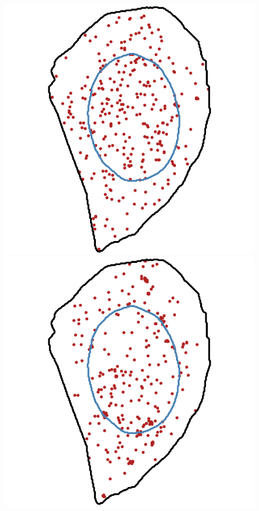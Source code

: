 \begin{figure}[h]
	\centering
		\includegraphics[width=\linewidth]{figures/chapter4/simulation_foci_10}
	\endminipage\hfill
		\includegraphics[width=\linewidth]{figures/chapter4/simulation_foci_50}

\end{figure}
